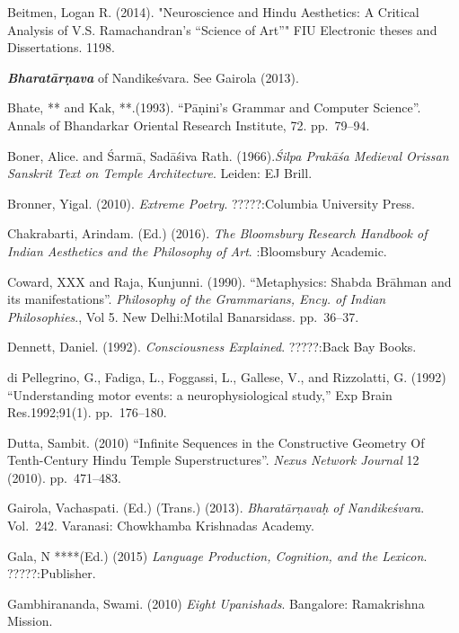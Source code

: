 \begin{thebibliography}{99}
\itemsep=2pt
Beitmen, Logan R. (2014). "Neuroscience and Hindu Aesthetics: A Critical Analysis of V.S. Ramachandran’s “Science of Art”" FIU Electronic theses and Dissertations. 1198.

{\sl\bfseries Bharatārṇava} of Nandikeśvara. See Gairola (2013).

Bhate, ** and Kak, **.(1993). “Pāṇini’s Grammar and Computer Science”. Annals of Bhandarkar Oriental Research Institute, 72. pp.~79--94.

Boner, Alice. and Śarmā, Sadāśiva Rath. (1966).\textsl{Śilpa Prakāśa Medieval Orissan Sanskrit Text on Temple Architecture}. Leiden: EJ Brill.

Bronner, Yigal. (2010). \textsl{Extreme Poetry}. ?????:Columbia University Press.

Chakrabarti, Arindam. (Ed.) (2016). \textsl{The Bloomsbury Research Handbook of Indian Aesthetics and the Philosophy of Art}. :Bloomsbury Academic.

Coward, XXX and Raja, Kunjunni. (1990). “Metaphysics: Shabda Brāhman and its manifestations”. \textsl{Philosophy of the Grammarians, Ency. of Indian Philosophies}., Vol 5. New Delhi:Motilal Banarsidass. pp.~36--37.

Dennett, Daniel. (1992). \textsl{Consciousness Explained}. ?????:Back Bay Books.

di Pellegrino, G., Fadiga, L., Foggassi, L., Gallese, V., and Rizzolatti, G. (1992) “Understanding motor events: a neurophysiological study,” Exp Brain Res.1992;91(1). pp.~176--180.

Dutta, Sambit. (2010) “Infinite Sequences in the Constructive Geometry Of Tenth-Century Hindu Temple  Superstructures”. \textsl{Nexus Network Journal} 12 (2010). pp.~471--483.

Gairola, Vachaspati. (Ed.) (Trans.) (2013). \textsl{Bharatārṇavaḥ of Nandikeśvara}. Vol.~242. Varanasi: Chowkhamba Krishnadas Academy.

Gala, N ****(Ed.) (2015) \textsl{Language Production, Cognition, and the Lexicon}. ?????:Publisher.

Gambhirananda, Swami. (2010) \textsl{Eight Upanishads}. Bangalore: Ramakrishna Mission.


\end{thebibliography}

